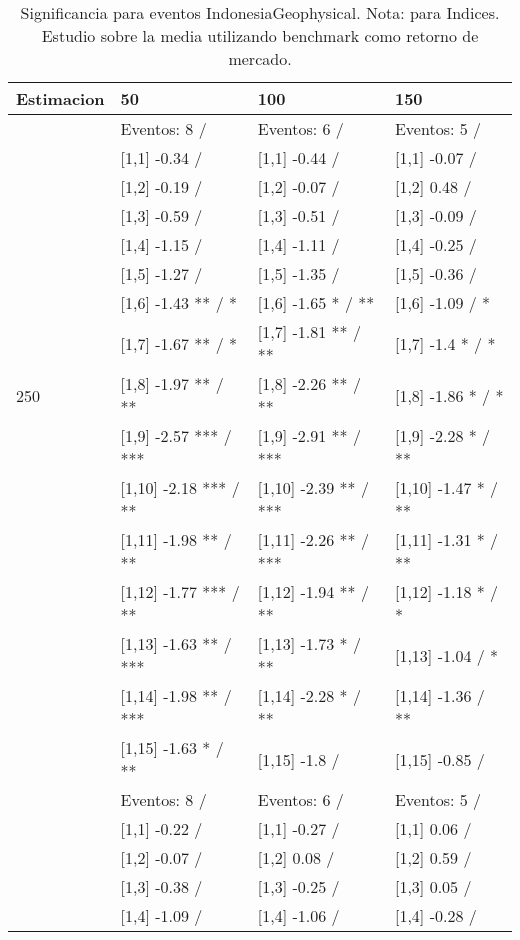 \begin{table}

\caption{Significancia para eventos IndonesiaGeophysical. Nota: para Indices. Estudio sobre la media utilizando benchmark como retorno de mercado.}
\centering
\begin{tabular}[t]{llll}
\toprule
Estimacion & 50 & 100 & 150\\
\midrule
 & Eventos:  8 / & Eventos:  6 / & Eventos:  5 /\\
 & {}[1,1] -0.34  / & {}[1,1] -0.44  / & {}[1,1] -0.07  /\\
 & {}[1,2] -0.19  / & {}[1,2] -0.07  / & {}[1,2] 0.48  /\\
 & {}[1,3] -0.59  / & {}[1,3] -0.51  / & {}[1,3] -0.09  /\\
 & {}[1,4] -1.15  / & {}[1,4] -1.11  / & {}[1,4] -0.25  /\\
\addlinespace
 & {}[1,5] -1.27  / & {}[1,5] -1.35  / & {}[1,5] -0.36  /\\
 & {}[1,6] -1.43 ** / * & {}[1,6] -1.65 * / ** & {}[1,6] -1.09  / *\\
 & {}[1,7] -1.67 ** / * & {}[1,7] -1.81 ** / ** & {}[1,7] -1.4 * / *\\
250 & {}[1,8] -1.97 ** / ** & {}[1,8] -2.26 ** / ** & {}[1,8] -1.86 * / *\\
 & {}[1,9] -2.57 *** / *** & {}[1,9] -2.91 ** / *** & {}[1,9] -2.28 * / **\\
\addlinespace
 & {}[1,10] -2.18 *** / ** & {}[1,10] -2.39 ** / *** & {}[1,10] -1.47 * / **\\
 & {}[1,11] -1.98 ** / ** & {}[1,11] -2.26 ** / *** & {}[1,11] -1.31 * / **\\
 & {}[1,12] -1.77 *** / ** & {}[1,12] -1.94 ** / ** & {}[1,12] -1.18 * / *\\
 & {}[1,13] -1.63 ** / *** & {}[1,13] -1.73 * / ** & {}[1,13] -1.04  / *\\
 & {}[1,14] -1.98 ** / *** & {}[1,14] -2.28 * / ** & {}[1,14] -1.36  / **\\
\addlinespace
 & {}[1,15] -1.63 * / ** & {}[1,15] -1.8  / & {}[1,15] -0.85  /\\
 & Eventos:  8 / & Eventos:  6 / & Eventos:  5 /\\
 & {}[1,1] -0.22  / & {}[1,1] -0.27  / & {}[1,1] 0.06  /\\
 & {}[1,2] -0.07  / & {}[1,2] 0.08  / & {}[1,2] 0.59  /\\
 & {}[1,3] -0.38  / & {}[1,3] -0.25  / & {}[1,3] 0.05  /\\
\addlinespace
 & {}[1,4] -1.09  / & {}[1,4] -1.06  / & {}[1,4] -0.28  /\\

\end{tabular}
\end{table}
